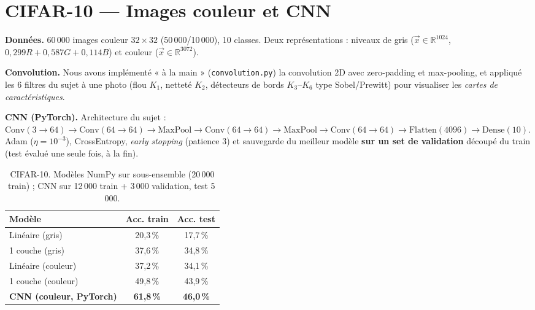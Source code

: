 \documentclass[11pt]{article}
\begin{document}
\section{CIFAR-10 --- Images couleur et CNN}
\textbf{Données.} 60\,000 images couleur $32\times32$ (50\,000/10\,000), 10 classes. Deux
représentations : niveaux de gris ($\vec{x}\in\mathbb{R}^{1024}$,
$0{,}299R+0{,}587G+0{,}114B$) et couleur ($\vec{x}\in\mathbb{R}^{3072}$).

\textbf{Convolution.} Nous avons implémenté « à la main » (\texttt{convolution.py}) la convolution 2D
avec zero-padding et max-pooling, et appliqué les 6 filtres du sujet à une photo (flou $K_1$, netteté
$K_2$, détecteurs de bords $K_3$--$K_6$ type Sobel/Prewitt) pour visualiser les \emph{cartes de
caractéristiques}.

\textbf{CNN (PyTorch).} Architecture du sujet :
$\mathrm{Conv}(3\!\to\!64)\!\to\!\mathrm{Conv}(64\!\to\!64)\!\to\!\mathrm{MaxPool}\!\to\!
\mathrm{Conv}(64\!\to\!64)\!\to\!\mathrm{MaxPool}\!\to\!\mathrm{Conv}(64\!\to\!64)\!\to\!
\mathrm{Flatten}(4096)\!\to\!\mathrm{Dense}(10)$.
Adam ($\eta=10^{-3}$), CrossEntropy, \emph{early stopping} (patience 3) et sauvegarde du meilleur
modèle \textbf{sur un set de validation} découpé du train (test évalué une seule fois, à la fin).

\begin{table}[H]
\centering\small
\begin{tabular}{lcc}
\toprule
Modèle & Acc. train & Acc. test \\
\midrule
Linéaire (gris)        & 20,3\,\% & 17,7\,\% \\
1 couche (gris)        & 37,6\,\% & 34,8\,\% \\
Linéaire (couleur)     & 37,2\,\% & 34,1\,\% \\
1 couche (couleur)     & 49,8\,\% & 43,9\,\% \\
\textbf{CNN (couleur, PyTorch)} & \textbf{61,8\,\%} & \textbf{46,0\,\%} \\
\bottomrule
\end{tabular}
\caption{CIFAR-10. Modèles NumPy sur sous-ensemble (20\,000 train) ; CNN sur 12\,000 train + 3\,000
validation, test 5\,000.}
\label{tab:cifar}
\end{table}
\end{document}
